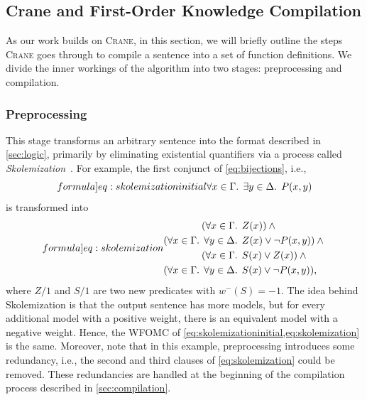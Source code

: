 \documentclass[a4paper,UKenglish,cleveref,autoref]{lipics-v2021}
\begin{document}
\subsection{Crane and First-Order Knowledge Compilation}\label{sec:crane}

As our work builds on \textsc{Crane}, in this section, we will briefly outline
the steps \textsc{Crane} goes through to compile a sentence into a set of
function definitions. We divide the inner workings of the algorithm into two
stages: preprocessing and compilation.

\subsubsection{Preprocessing}\label{sec:preprocessing}

This stage transforms an arbitrary sentence into the format described in
\cref{sec:logic}, primarily by eliminating existential quantifiers via a process
called \emph{Skolemization}~\cite{DBLP:conf/kr/BroeckMD14}. For example, the
first conjunct of \cref{eq:bijections}, i.e.,
\begin{equation}\label[formula]{eq:skolemizationinitial}
  \forall x \in \Gamma\text{. }\exists y \in \Delta\text{. } P(x, y)
\end{equation}
is transformed into
\begin{equation}\label[formula]{eq:skolemization}
  \begin{aligned}
    (\forall x \in \Gamma\text{. } &Z(x))\land{}\\
    (\forall x \in \Gamma\text{. } \forall y \in \Delta\text{. } &Z(x) \lor \neg P(x, y))\land{}\\
    (\forall x \in \Gamma\text{. } &S(x) \lor Z(x))\land{}\\
    (\forall x \in \Gamma\text{. } \forall y \in \Delta\text{. } &S(x) \lor \neg P(x, y)),
  \end{aligned}
\end{equation}
where $Z/1$ and $S/1$ are two new predicates with $w^{-}(S) = -1$. The idea
behind Skolemization is that the output sentence has more models, but for every
additional model with a positive weight, there is an equivalent model with a
negative weight. Hence, the WFOMC of
\cref{eq:skolemizationinitial,eq:skolemization} is the same. Moreover, note that
in this example, preprocessing introduces some redundancy, i.e., the second and
third clauses of \cref{eq:skolemization} could be removed. These redundancies
are handled at the beginning of the compilation process described in
\cref{sec:compilation}.
\end{document}
